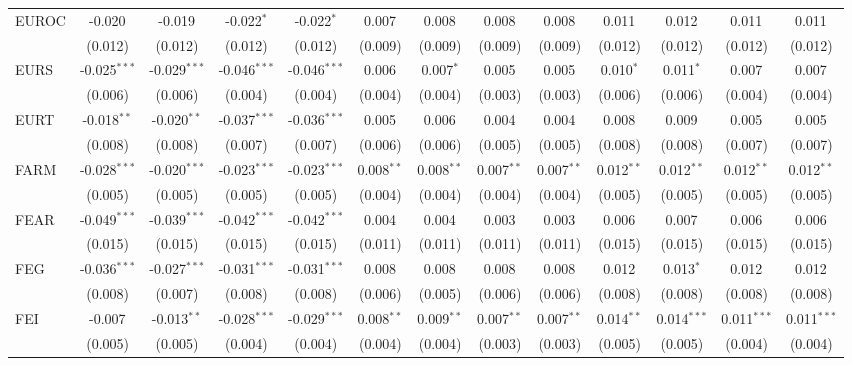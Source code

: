 \begin{table}[!htbp]
\begin{tabular}{@{\extracolsep{5pt}}lcccccccccccc}
 EUROC & -0.020$^{}$ & -0.019$^{}$ & -0.022$^{*}$ & -0.022$^{*}$ & 0.007$^{}$ & 0.008$^{}$ & 0.008$^{}$ & 0.008$^{}$ & 0.011$^{}$ & 0.012$^{}$ & 0.011$^{}$ & 0.011$^{}$ \\
  & (0.012) & (0.012) & (0.012) & (0.012) & (0.009) & (0.009) & (0.009) & (0.009) & (0.012) & (0.012) & (0.012) & (0.012) \\
 EURS & -0.025$^{***}$ & -0.029$^{***}$ & -0.046$^{***}$ & -0.046$^{***}$ & 0.006$^{}$ & 0.007$^{*}$ & 0.005$^{}$ & 0.005$^{}$ & 0.010$^{*}$ & 0.011$^{*}$ & 0.007$^{}$ & 0.007$^{}$ \\
  & (0.006) & (0.006) & (0.004) & (0.004) & (0.004) & (0.004) & (0.003) & (0.003) & (0.006) & (0.006) & (0.004) & (0.004) \\
 EURT & -0.018$^{**}$ & -0.020$^{**}$ & -0.037$^{***}$ & -0.036$^{***}$ & 0.005$^{}$ & 0.006$^{}$ & 0.004$^{}$ & 0.004$^{}$ & 0.008$^{}$ & 0.009$^{}$ & 0.005$^{}$ & 0.005$^{}$ \\
  & (0.008) & (0.008) & (0.007) & (0.007) & (0.006) & (0.006) & (0.005) & (0.005) & (0.008) & (0.008) & (0.007) & (0.007) \\
 FARM & -0.028$^{***}$ & -0.020$^{***}$ & -0.023$^{***}$ & -0.023$^{***}$ & 0.008$^{**}$ & 0.008$^{**}$ & 0.007$^{**}$ & 0.007$^{**}$ & 0.012$^{**}$ & 0.012$^{**}$ & 0.012$^{**}$ & 0.012$^{**}$ \\
  & (0.005) & (0.005) & (0.005) & (0.005) & (0.004) & (0.004) & (0.004) & (0.004) & (0.005) & (0.005) & (0.005) & (0.005) \\
 FEAR & -0.049$^{***}$ & -0.039$^{***}$ & -0.042$^{***}$ & -0.042$^{***}$ & 0.004$^{}$ & 0.004$^{}$ & 0.003$^{}$ & 0.003$^{}$ & 0.006$^{}$ & 0.007$^{}$ & 0.006$^{}$ & 0.006$^{}$ \\
  & (0.015) & (0.015) & (0.015) & (0.015) & (0.011) & (0.011) & (0.011) & (0.011) & (0.015) & (0.015) & (0.015) & (0.015) \\
 FEG & -0.036$^{***}$ & -0.027$^{***}$ & -0.031$^{***}$ & -0.031$^{***}$ & 0.008$^{}$ & 0.008$^{}$ & 0.008$^{}$ & 0.008$^{}$ & 0.012$^{}$ & 0.013$^{*}$ & 0.012$^{}$ & 0.012$^{}$ \\
  & (0.008) & (0.007) & (0.008) & (0.008) & (0.006) & (0.005) & (0.006) & (0.006) & (0.008) & (0.008) & (0.008) & (0.008) \\
 FEI & -0.007$^{}$ & -0.013$^{**}$ & -0.028$^{***}$ & -0.029$^{***}$ & 0.008$^{**}$ & 0.009$^{**}$ & 0.007$^{**}$ & 0.007$^{**}$ & 0.014$^{**}$ & 0.014$^{***}$ & 0.011$^{***}$ & 0.011$^{***}$ \\
  & (0.005) & (0.005) & (0.004) & (0.004) & (0.004) & (0.004) & (0.003) & (0.003) & (0.005) & (0.005) & (0.004) & (0.004) \\

\end{tabular}
\end{table}
